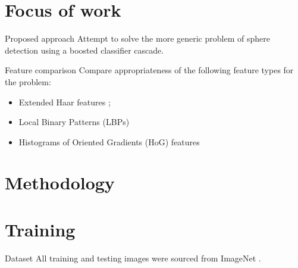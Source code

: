 \documentclass{beamer}
\begin{document}
\section{Focus of work}
	\begin{frame}{Proposed approach}
		Attempt to solve the more generic problem of sphere detection using a boosted classifier cascade.
	\end{frame}

	\begin{frame}{Feature comparison}
		Compare appropriateness of the following feature types for the problem:
		\begin{itemize}
			\item Extended
        Haar features \citep{Lienhart2002extended};
			\item Local Binary Patterns (LBPs) \citep{liao2007learning}
			\item Histograms of Oriented Gradients (HoG) features \citep{dalal2005histograms}
		\end{itemize}
	\end{frame}

\section{Methodology}

\section{Training}

\begin{frame}{Dataset}
	All training and testing images were sourced from ImageNet \citep{imagenet_cvpr09}.
\end{frame}
\end{document}
